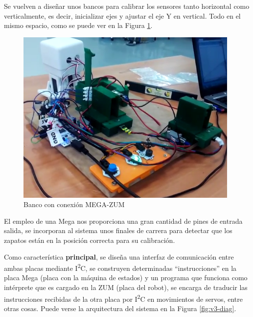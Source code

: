Se vuelven a diseñar unos bancos para calibrar los sensores tanto horizontal como verticalmente, es decir, inicializar ejes y ajustar el eje Y en vertical. Todo en el mismo espacio, como se puede ver en la Figura \ref{fig:bancov3}.

\begin{figure}
\centering
\includegraphics[width=110mm]{Figures/banco_v3}
\caption[Banco con conexión MEGA-ZUM]{Banco con conexión MEGA-ZUM}
\label{fig:bancov3}
\end{figure}

El empleo de una Mega nos proporciona una gran cantidad de pines de entrada salida, se incorporan al sistema unos finales de carrera para detectar que los zapatos están en la posición correcta para su calibración.

Como característica \textbf{principal}, se diseña una interfaz de comunicación entre ambas placas mediante I\textsuperscript{2}C, se construyen determinadas ``instrucciones'' en la placa Mega (placa con la máquina de estados) y un programa que funciona como intérprete que es cargado en la ZUM (placa del robot), se encarga de traducir las instrucciones recibidas de la otra placa por I\textsuperscript{2}C en movimientos de servos, entre otras cosas. Puede verse la arquitectura del sistema en la Figura \ref{fig:v3-diag}.

